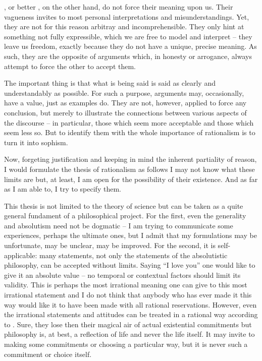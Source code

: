 {, or better , on the other hand, 
do not force their meaning upon us. Their vagueness invites to most personal
interpretations and misunderstandings. Yet, they are not for this reason arbitray
and incomprehensible. 
They only hint at something not fully expressible, which we
are free to model and interpret -- they leave us freedom, exactly
because they do not have a unique, precise meaning.
As such, they are the opposite of arguments which, in honesty or
arrogance, always attempt to force the other to accept them.


\pa
The important thing is that what is being said is said as clearly and understandably
as possible. For such a purpose, arguments may, occasionally, have a value, just as
examples do. They are not, however, applied to force any conclusion, but merely to 
illustrate the connections between various aspects of the discourse -- in particular,
those which seem more acceptable and those which seem less so. 
But to identify them with the whole importance of rationalism is to turn it into
sophism.

Now, forgeting justification and keeping in mind the inherent partiality of reason, 
I would formulate the thesis of rationalism as follows
I may not know what these limits are but, at least, I am open for the 
possibility of their existence. And as far as I am able to, I try
to specify them. 

\pa
This thesis is not limited to the theory of science but 
can be taken as a quite general fundament of a philosophical project. For 
the first, even the generality and absolutism need not be dogmatic -- I am trying
to communicate some experiences, perhaps the ultimate ones, but I admit that
my formulations may be unfortunate, may be unclear, may be improved.
For the second, it is self-applicable: many statements, not only the statements of
the absolutistic philosophy, can be accepted without limits. Saying ``I 
love you'' one would like to give it an absolute value -- no temporal 
or contextual factors should limit its validity. This is perhaps the most 
irrational meaning one can give to this most irrational statement and I do 
not think that anybody who has ever made it this way would like it to 
have been made with all rational reservations. However, 
even the irrational statements and attitudes can be treated in a rational 
way according to . Sure, they lose then their magical air 
of actual existential commitments but philosophy is, at best, a reflection 
of life and never the life itself. It may invite to making some 
commitments or choosing a particular way, but it is never such a commitment 
or choice itself.

}
